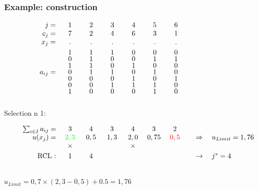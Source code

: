\documentclass[]{beamer}
\begin{document}
\begin{frame}
  \frametitle{Example: construction}
\vspace{3mm}


{\small
$
\left.
\begin{array}{rccccccl}

j =   & 1 & 2 & 3 & 4 & 5 & 6 \vspace{0mm}\\	
c_j =   & 7 & 2 & 4 &  6 & 3 & 1 \vspace{0mm}\\	
x_j =   & . & . & . &  . & . & . \vspace{1mm}\\	
						
&	1 &	1 &	1 &   0  &	0  &	0  &	 \vspace{-1mm}\\
&	0  &	1 &	0  &	0  &	1 &	1 &	 \vspace{-1mm}\\
&	1 &	1 &	0  &	1 &	0  &	0  &	 \vspace{-1mm}\\
a_{ij} = &	 0 &	1 &	1 &	0  &	1 &	0  &	 \vspace{-1mm}\\
&	0  &	0  &	0  &	1 &	0  &	1 &	 \vspace{-1mm}\\
&	0  &	0  &	1 &	1 &	1 &	0  &	  \vspace{-1mm}\\
&	1 &	0  &	0  &	0 &	1  &	0  &	  \vspace{-2mm}\\
\ \qquad \qquad \ \qquad  & \qquad & \qquad & \qquad & \qquad & \qquad & \qquad & 							
\end{array}
\right.
$

Selection n 1:\vspace{2mm}

$
\left.
\begin{array}{rccccccl}

\qquad \sum_{i\in I} a_{ij} = &	3 &	4 &	3 &	4 &	3 &	2 \\	
u(x_j) = &	\textcolor{green}{2,3} & 0,5 &  1,3 & 2,0 &  0,75 & \textcolor{red}{0,5} & \quad \Rightarrow \quad u_{Limit} = 1,76%
\\	
               & \times &  &  & \times &  & \vspace{1mm}
\\
\mbox{RCL :} & 1 & 4 &  &  &  & & \quad \rightarrow \quad j^{*} = 4\\
\quad & \qquad & \qquad & \qquad & \qquad & \qquad & \qquad & \\ 
	
\end{array}
\right.
$
\vspace{3mm}
\centerline{$u_{Limit} = 0,7 \times (2,3 - 0,5) + 0.5 = 1,76$}
}
\end{frame}
\end{document}
